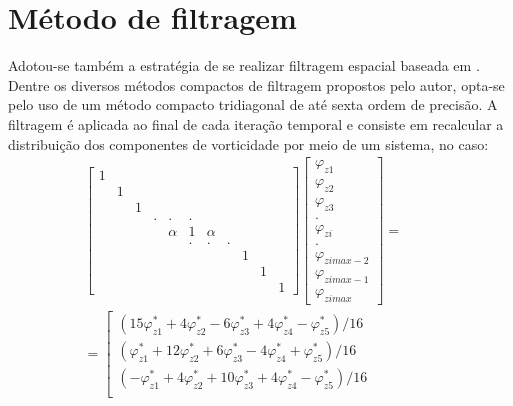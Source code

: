 \section{Método de filtragem}\label{SecFiltragem}

Adotou-se também a estratégia de se realizar filtragem espacial baseada em \cite{lele1992compact}. Dentre os diversos métodos compactos de filtragem propostos pelo autor, opta-se pelo uso de um método compacto tridiagonal de até sexta ordem de precisão. A filtragem é aplicada ao final de cada iteração temporal e consiste em recalcular a distribuição dos componentes de vorticidade por meio de um sistema, no caso:
\begin{align}
\left[\begin{array}{ccccccccccc}
1 &  & & & & & & & & &\\
 & 1 &  & & & & & & & & \\
& & 1 & & & & & & & &\\
& &  & . & . & .&  &  & & & \\
& & &  & \alpha & 1 & \alpha &  & & &  \\
& & & &  & . & . & . &  & & \\
& & & & &  &  & & 1 & & \\
& & & & &  &  & & & 1 & \\
& & & & &  &  & & &  & 1
\end{array}\right] \left[\begin{array}{c}
\varphi_{z1} \\
\varphi_{z2}  \\
\varphi_{z3}  \\
 . \\
\varphi_{zi}  \\
 . \\
\varphi_{zimax-2} \\
\varphi_{zimax-1} \\
\varphi_{zimax} 
\end{array}\right] = \hspace{1cm} \nonumber\\ 
=\left[\begin{array}{c}
(15\varphi_{z1}^* +  4 \varphi_{z2}^* -  6 \varphi_{z3}^* +  4  \varphi_{z4}^*
 -         \varphi_{z5}^* ) / 16 \\
( \varphi_{z1}^* + 12\varphi_{z2}^*+  6\varphi_{z3}^* -  4 \varphi_{z4}^*
+         \varphi_{z5}^*) / 16\\
 (   - \varphi_{z1}^* +  4\varphi_{z2}^*
+ 10\varphi_{z3}^* +  4\varphi_{z4}^* - \varphi_{z5}^* ) / 16\\

\end{array}
\end{align}
